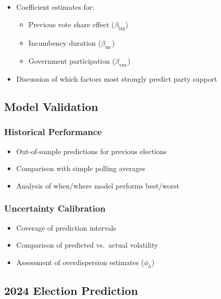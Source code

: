 \documentclass[
  letterpaper,
  DIV=11,
  numbers=noendperiod]{scrartcl}
\providecommand{\tightlist}{%
  \setlength{\itemsep}{0pt}\setlength{\parskip}{0pt}}\usepackage{longtable,booktabs,array}
\begin{document}
\begin{itemize}
\tightlist
\item
  Coefficient estimates for:

  \begin{itemize}
  \tightlist
  \item
    Previous vote share effect (\(\beta_\text{lag}\))
  \item
    Incumbency duration (\(\beta_\text{inc}\))
  \item
    Government participation (\(\beta_\text{vnv}\))
  \end{itemize}
\item
  Discussion of which factors most strongly predict party support
\end{itemize}

\subsection{Model Validation}\label{model-validation}

\subsubsection{Historical Performance}\label{historical-performance}

\begin{itemize}
\tightlist
\item
  Out-of-sample predictions for previous elections
\item
  Comparison with simple polling averages
\item
  Analysis of when/where model performs best/worst
\end{itemize}

\subsubsection{Uncertainty Calibration}\label{uncertainty-calibration}

\begin{itemize}
\tightlist
\item
  Coverage of prediction intervals
\item
  Comparison of predicted vs.~actual volatility
\item
  Assessment of overdispersion estimates (\(\phi_h\))
\end{itemize}

\subsection{2024 Election Prediction}\label{election-prediction}
\end{document}
